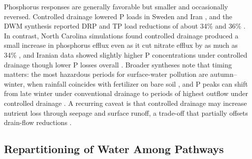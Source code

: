 \documentclass[11pt]{article}
\begin{document}
Phosphorus responses are generally favorable but smaller and occasionally
reversed. Controlled drainage lowered P loads in Sweden and Iran
\parencite{Wesström2007,Wesström2001,Jouni2018}, and the DWM synthesis reported
DRP and TP load reductions of about 34\% and 36\%
\parencite{Frankenberger2024}. In contrast, North Carolina simulations found
controlled drainage produced a small increase in phosphorus efflux even as it
cut nitrate efflux by as much as 34\% \parencite{DEAL1986}, and Iranian data
showed slightly higher P concentrations under controlled drainage though lower P
losses overall \parencite{Jouni2018}. Broader syntheses note that timing matters:
the most hazardous periods for surface-water pollution are autumn--winter, when
rainfall coincides with fertilizer on bare soil \parencite{Tolomio2018}, and P
peaks can shift from late winter under conventional drainage to periods of
highest outflow under controlled drainage \parencite{Wesström2007}. A recurring
caveat is that controlled drainage may increase nutrient loss through seepage
and surface runoff, a trade-off that partially offsets drain-flow reductions
\parencite{Frankenberger2024}.

\subsection{Repartitioning of Water Among Pathways}
\end{document}
